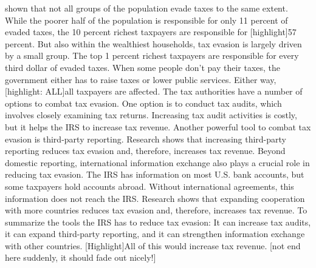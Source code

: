 \documentclass[11pt]{article}
\begin{document}
shown that not all groups of the population evade taxes to the same extent. While the poorer half of the population is responsible for only 11 percent of evaded taxes, the 10 percent richest taxpayers are responsible for [highlight]57 percent. But also within the wealthiest households, tax evasion is largely driven by a small group. The top 1 percent richest taxpayers are responsible for every third dollar of evaded taxes.  When some people don’t pay their taxes, the government either has to raise taxes or lower public services. Either way, [highlight: ALL]all taxpayers are affected. The tax authorities have a number of options to combat tax evasion. One option is to conduct tax audits, which involves closely examining tax returns. Increasing tax audit activities is costly, but it helps the IRS to increase tax revenue. Another powerful tool to combat tax evasion is third-party reporting. Research shows that increasing third-party reporting reduces tax evasion and, therefore, increases tax revenue. Beyond domestic reporting, international information exchange also plays a crucial role in reducing tax evasion. The IRS has information on most U.S. bank accounts, but some taxpayers hold accounts abroad. Without international agreements, this information does not reach the IRS. Research shows that expanding cooperation with more countries reduces tax evasion and, therefore, increases tax revenue. To summarize the tools the IRS has to reduce tax evasion: It can increase tax audits, it can expand third-party reporting, and it can strengthen information exchange with other countries. [Highlight]All of this would increase tax revenue. [not end here suddenly, it should fade out nicely!]
\newpage
\printbibliography
\end{document}
